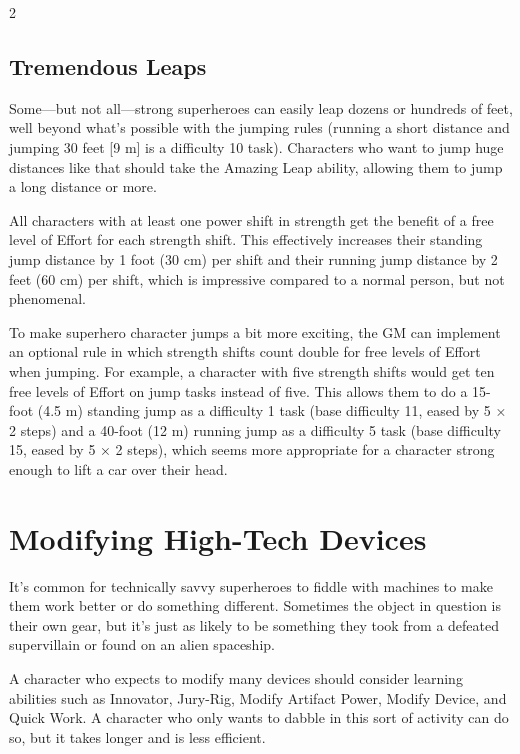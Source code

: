 \begin{multicols}{2}

\subsection{Tremendous Leaps}

Some—but not all—strong superheroes can easily leap dozens or hundreds of feet, well beyond what’s possible with the jumping rules (running a short distance and jumping 30 feet [9 m] is a difficulty 10 task). Characters who want to jump huge distances like that should take the Amazing Leap ability, allowing them to jump a long distance or more.

All characters with at least one power shift in strength get the benefit of a free level of Effort for each strength shift. This effectively increases their standing jump distance by 1 foot (30 cm) per shift and their running jump distance by 2 feet (60 cm) per shift, which is impressive compared to a normal person, but not phenomenal.

To make superhero character jumps a bit more exciting, the GM can implement an optional rule in which strength shifts count double for free levels of Effort when jumping. For example, a character with five strength shifts would get ten free levels of Effort on jump tasks instead of five. This allows them to do a 15-foot (4.5 m) standing jump as a difficulty 1 task (base difficulty 11, eased by 5 × 2 steps) and a 40-foot (12 m) running jump as a difficulty 5 task (base difficulty 15, eased by 5 × 2 steps), which seems more appropriate for a character strong enough to lift a car over their head.

\section{Modifying High-Tech Devices}

It’s common for technically savvy superheroes to fiddle with machines to make them work better or do something different. Sometimes the object in question is their own gear, but it’s just as likely to be something they took from a defeated supervillain or found on an alien spaceship.

A character who expects to modify many devices should consider learning abilities such as Innovator, Jury-Rig, Modify Artifact Power, Modify Device, and Quick Work. A character who only wants to dabble in this sort of activity can do so, but it takes longer and is less efficient.


\end{multicols}
